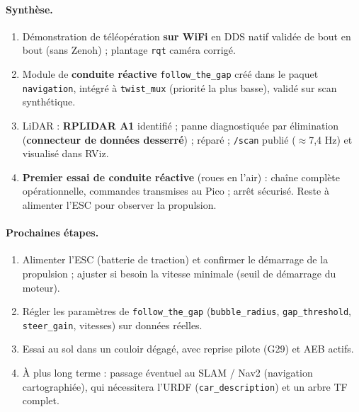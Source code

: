 \documentclass[a4paper,11pt]{article}
\begin{document}
\paragraph{Synthèse.}
\begin{enumerate}[leftmargin=1.6em]
  \item Démonstration de téléopération \textbf{sur WiFi} en DDS natif validée de
        bout en bout (sans Zenoh) ; plantage \texttt{rqt} caméra corrigé.
  \item Module de \textbf{conduite réactive} \texttt{follow\_the\_gap} créé dans le
        paquet \texttt{navigation}, intégré à \texttt{twist\_mux} (priorité la plus
        basse), validé sur scan synthétique.
  \item LiDAR : \textbf{RPLIDAR A1} identifié ; panne diagnostiquée par élimination
        (\textbf{connecteur de données desserré}) ; réparé ; \texttt{/scan} publié
        ($\approx$7,4 Hz) et visualisé dans RViz.
  \item \textbf{Premier essai de conduite réactive} (roues en l'air) : chaîne
        complète opérationnelle, commandes transmises au Pico ; arrêt sécurisé.
        Reste à alimenter l'ESC pour observer la propulsion.
\end{enumerate}

\paragraph{Prochaines étapes.}
\begin{enumerate}[leftmargin=1.6em]
  \item Alimenter l'ESC (batterie de traction) et confirmer le démarrage de la
        propulsion ; ajuster si besoin la vitesse minimale (seuil de démarrage du
        moteur).
  \item Régler les paramètres de \texttt{follow\_the\_gap}
        (\texttt{bubble\_radius}, \texttt{gap\_threshold}, \texttt{steer\_gain},
        vitesses) sur données réelles.
  \item Essai au sol dans un couloir dégagé, avec reprise pilote (G29) et AEB
        actifs.
  \item À plus long terme : passage éventuel au SLAM / Nav2 (navigation
        cartographiée), qui nécessitera l'URDF (\texttt{car\_description}) et un
        arbre TF complet.
\end{enumerate}
\end{document}
